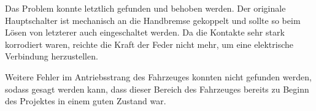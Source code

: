 Das Problem konnte letztlich gefunden und behoben werden. Der originale Hauptschalter ist mechanisch an die Handbremse gekoppelt und sollte so beim Lösen von letzterer auch eingeschaltet werden. Da die Kontakte sehr stark korrodiert waren, reichte die Kraft der Feder nicht mehr, um eine elektrische Verbindung herzustellen. 

Weitere Fehler im Antriebsstrang des Fahrzeuges konnten nicht gefunden werden, sodass gesagt werden kann, dass dieser Bereich des Fahrzeuges bereits zu Beginn des Projektes in einem guten Zustand war.




\newpage